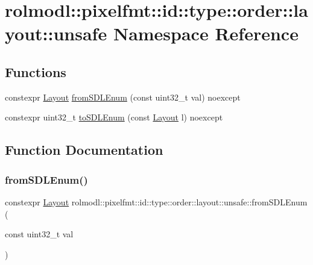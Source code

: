\hypertarget{namespacerolmodl_1_1pixelfmt_1_1id_1_1type_1_1order_1_1layout_1_1unsafe}{}\section{rolmodl\+::pixelfmt\+::id\+::type\+::order\+::layout\+::unsafe Namespace Reference}
\label{namespacerolmodl_1_1pixelfmt_1_1id_1_1type_1_1order_1_1layout_1_1unsafe}
\subsection*{Functions}
\begin{DoxyCompactItemize}
\item 
constexpr \mbox{\hyperlink{namespacerolmodl_1_1pixelfmt_1_1id_1_1type_1_1order_a4177275b82f1923d1a2f07e1f87f0391}{Layout}} \mbox{\hyperlink{namespacerolmodl_1_1pixelfmt_1_1id_1_1type_1_1order_1_1layout_1_1unsafe_a52d7ddf91443a25f75cd173608748d51}{from\+S\+D\+L\+Enum}} (const uint32\+\_\+t val) noexcept
\item 
constexpr uint32\+\_\+t \mbox{\hyperlink{namespacerolmodl_1_1pixelfmt_1_1id_1_1type_1_1order_1_1layout_1_1unsafe_aa9a521730909e8a7f08c19ad4f0b533f}{to\+S\+D\+L\+Enum}} (const \mbox{\hyperlink{namespacerolmodl_1_1pixelfmt_1_1id_1_1type_1_1order_a4177275b82f1923d1a2f07e1f87f0391}{Layout}} l) noexcept
\end{DoxyCompactItemize}


\subsection{Function Documentation}
\mbox{\label{namespacerolmodl_1_1pixelfmt_1_1id_1_1type_1_1order_1_1layout_1_1unsafe_a52d7ddf91443a25f75cd173608748d51}} 
\subsubsection{\texorpdfstring{fromSDLEnum()}{fromSDLEnum()}}
{\footnotesize\ttfamily constexpr \mbox{\hyperlink{namespacerolmodl_1_1pixelfmt_1_1id_1_1type_1_1order_a4177275b82f1923d1a2f07e1f87f0391}{Layout}} rolmodl\+::pixelfmt\+::id\+::type\+::order\+::layout\+::unsafe\+::from\+S\+D\+L\+Enum (\begin{DoxyParamCaption}\item[{const uint32\+\_\+t}]{val }\end{DoxyParamCaption})\hspace{0.3cm}{\ttfamily [noexcept]}}



